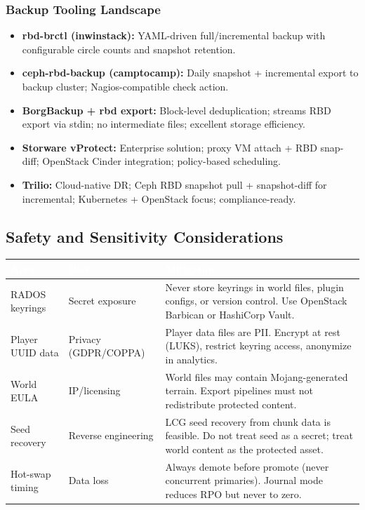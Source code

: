 \documentclass[11pt,letterpaper]{article}
\newcommand{\tableheader}[1]{\textbf{\sffamily\textcolor{white}{#1}}}
\begin{document}
\subsubsection{Backup Tooling Landscape}

\begin{itemize}[leftmargin=2em]
  \item \textbf{rbd-brctl (inwinstack):} YAML-driven full/incremental backup with configurable circle counts and snapshot retention.
  \item \textbf{ceph-rbd-backup (camptocamp):} Daily snapshot + incremental export to backup cluster; Nagios-compatible check action.
  \item \textbf{BorgBackup + rbd export:} Block-level deduplication; streams RBD export via stdin; no intermediate files; excellent storage efficiency.
  \item \textbf{Storware vProtect:} Enterprise solution; proxy VM attach + RBD snap-diff; OpenStack Cinder integration; policy-based scheduling.
  \item \textbf{Trilio:} Cloud-native DR; Ceph RBD snapshot pull + snapshot-diff for incremental; Kubernetes + OpenStack focus; compliance-ready.
\end{itemize}

\subsection{Safety and Sensitivity Considerations}

\begin{center}
\begin{tabularx}{\textwidth}{L{4cm}L{3cm}X}
\toprule
{}
\tableheader{Area} & \tableheader{Risk} & \tableheader{Mitigation} \\
\midrule
RADOS keyrings & Secret exposure & Never store keyrings in world files, plugin configs, or version control. Use OpenStack Barbican or HashiCorp Vault. \\
Player UUID data & Privacy (GDPR/COPPA) & Player data files are PII. Encrypt at rest (LUKS), restrict keyring access, anonymize in analytics. \\
World EULA & IP/licensing & World files may contain Mojang-generated terrain. Export pipelines must not redistribute protected content. \\
Seed recovery & Reverse engineering & LCG seed recovery from chunk data is feasible. Do not treat seed as a secret; treat world content as the protected asset. \\
Hot-swap timing & Data loss & Always demote before promote (never concurrent primaries). Journal mode reduces RPO but never to zero. \\
\bottomrule
\end{tabularx}
\end{center}
\end{document}
